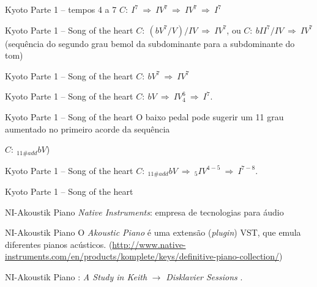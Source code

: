 \documentclass[aspectratio=169]{beamer}
\begin{document}
\begin{frame}{Kyoto Parte 1 -- tempos 4 a 7}
$C:~I^7~\Rightarrow~IV^7~\Rightarrow~IV^7~\Rightarrow~I^7$
\end{frame}

\begin{frame}{Kyoto Parte 1 -- Song of the heart}
$C:~(bV^7/V)/IV~\Rightarrow~IV^7$, ou $C:~bII^7/IV~\Rightarrow~IV^7$ (sequência do segundo grau bemol da subdominante para a subdominante do tom)
\end{frame}

\begin{frame}{Kyoto Parte 1 -- Song of the heart}
$C:~bV^7~\Rightarrow~IV^7$
\end{frame}

\begin{frame}{Kyoto Parte 1 -- Song of the heart}
$C:~bV~\Rightarrow~IV^6_{4}~\Rightarrow~I^7$. 
\end{frame}

\begin{frame}{Kyoto Parte 1 -- Song of the heart}
O baixo pedal pode sugerir um 11 grau aumentado no primeiro acorde da sequência 

$C:~_{11\#add}bV$)
\end{frame}

\begin{frame}{Kyoto Parte 1 -- Song of the heart}
$C:~_{11\#add}bV~\Rightarrow~_{5}IV^{4-5}~\Rightarrow~I^{7-8}$.
\end{frame}

\begin{frame}{Kyoto Parte 1 -- Song of the heart}
\centering{}
\end{frame}

\begin{frame}{NI-Akoustik Piano}
\emph{Native Instruments}: empresa de tecnologias para áudio 
\end{frame}

\begin{frame}{NI-Akoustik Piano}
O \emph{Akoustic Piano} é uma extensão (\emph{plugin}) VST, que emula diferentes pianos acústicos. (\url{http://www.native-instruments.com/en/products/komplete/keys/definitive-piano-collection/})
\end{frame}

\begin{frame}{NI-Akoustik Piano}
: \emph{A Study in Keith} $\rightarrow$ \emph{Disklavier Sessions} \cite{sorensen_disklavier_2013}.
\end{frame}
\end{document}
